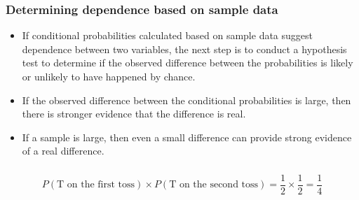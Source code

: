
\begin{frame}
\frametitle{Determining dependence based on sample data}

\begin{itemize}

\item If conditional probabilities calculated based on sample data suggest dependence between two variables, the next step is to conduct a hypothesis test to determine if the observed difference between the probabilities is likely or unlikely to have happened by chance.

\item If the observed difference between the conditional probabilities is large, then there is stronger evidence that the difference is real.

\item If a sample is large, then even a small difference can provide strong evidence of a real difference.

\end{itemize}

\end{frame}


\begin{frame}
\frametitle{}


\pause


\pause

\[ P(\text{T on the first toss}) \times  P(\text{T on the second toss}) = \frac{1}{2} \times \frac{1}{2} = \frac{1}{4} \]

\end{frame}


